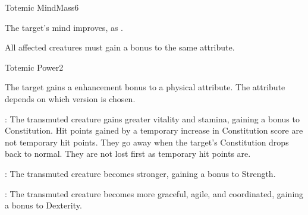 \begin{spellsection}{Totemic Mind}{Mass}{6}
\begin{spellheader}
    \begin{spelltargetinginfo}
    \end{spelltargetinginfo}
\end{spellheader}
\begin{spellcontent}
    \begin{spelleffects}
        \spelleffect The target's mind improves, as . 
    \end{spelleffects}
\end{spellcontent}
\begin{spellfooter}
    \spellnotes All affected creatures must gain a bonus to the same attribute.
\end{spellfooter}
\end{spellsection}

\begin{spellsection}{Totemic Power}{2}
\begin{spellheader}
    \begin{spelltargetinginfo}
    \end{spelltargetinginfo}
\end{spellheader}
\begin{spellcontent}
    \begin{spelleffects}
        \spelleffect The target gains a  enhancement bonus to a physical attribute. The attribute depends on which version is chosen.
        \par {}: The transmuted creature gains greater vitality and stamina, gaining a bonus to Constitution. Hit points gained by a temporary increase in Constitution score are not temporary hit points. They go away when the target's Constitution drops back to normal. They are not lost first as temporary hit points are.
        \par {}: The transmuted creature becomes stronger, gaining a bonus to Strength.
        \par {}: The transmuted creature becomes more graceful, agile, and coordinated, gaining a bonus to Dexterity.
        \spelldur \durshort
    \end{spelleffects}
\end{spellcontent}
\begin{spellfooter}
\end{spellfooter}
\end{spellsection}

